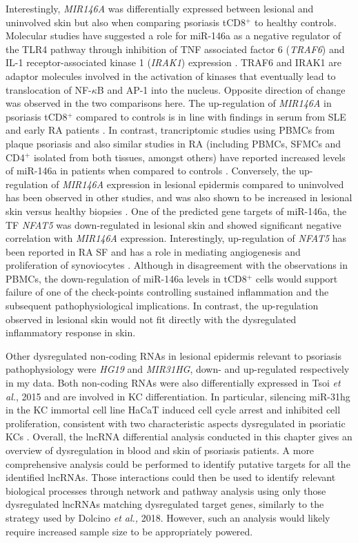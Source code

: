 Interestingly, \textit{MIR146A} was differentially expressed between lesional and uninvolved skin but also when comparing psoriasis tCD8$^+$ to healthy controls. Molecular studies have suggested a role for miR-146a as a negative regulator of the TLR4 pathway through inhibition of TNF associated factor 6 (\textit{TRAF6}) and IL-1 receptor-associated kinase 1 (\textit{IRAK1}) expression \parencite{Taganov2006}. TRAF6 and IRAK1 are adaptor molecules involved in the activation of kinases that eventually lead to translocation of NF-$\kappa$B and AP-1 into the nucleus. Opposite direction of change was observed in the two comparisons here. The up-regulation of \textit{MIR146A} in psoriasis tCD8$^+$ compared to controls is in line with findings in serum from SLE and early RA patients \parencite{Wang2012,Filkova}. In contrast, trancriptomic studies using PBMCs from plaque psoriasis and also similar studies in RA (including PBMCs, SFMCs and CD4$^+$ isolated from both tissues, amongst others) have reported increased levels of miR-146a in patients when compared to controls \parencite{Ele-Refaei2015,Churov2015}. Conversely, the up-regulation of \textit{MIR146A} expression in lesional epidermis compared to uninvolved has been observed in other studies, and was also shown to be increased in lesional skin versus healthy biopsies \parencite{Lerman2014, Tsoi2015,Li2014}. One of the predicted gene targets of miR-146a, the TF \textit{NFAT5} was down-regulated in lesional skin and showed significant negative correlation with \textit{MIR146A} expression. Interestingly, up-regulation of \textit{NFAT5} has been reported in RA SF and has a role in mediating angiogenesis and proliferation of synoviocytes \parencite{Han2017}. Although in disagreement with the observations in PBMCs, the down-regulation of miR-146a levels in tCD8$^+$ cells would support failure of one of the check-points controlling sustained inflammation and the subsequent pathophysiological implications. In contrast, the up-regulation observed in lesional skin would not fit directly with the dysregulated inflammatory response in skin. 


Other dysregulated non-coding RNAs in lesional epidermis relevant to psoriasis pathophysiology were \textit{HG19} and \textit{MIR31HG}, down- and up-regulated respectively in my data. Both non-coding RNAs were also differentially expressed in Tsoi \textit{et al.}, 2015 and are involved in KC differentiation. In particular, silencing miR-31hg in the KC immortal cell line HaCaT induced cell cycle arrest and inhibited cell proliferation, consistent with two characteristic aspects dysregulated in psoriatic KCs \parencite{Gao2018}.
Overall, the lncRNA differential analysis conducted in this chapter gives an overview of dysregulation in blood and skin of psoriasis patients. A more comprehensive analysis could be performed to identify putative targets for all the identified lncRNAs. Those interactions could then be used to identify relevant biological processes through network and pathway analysis using only those dysregulated lncRNAs matching dysregulated target genes, similarly to the strategy used by Dolcino \textit{et al.,} 2018. However, such an analysis would likely require increased sample size to be appropriately powered.

